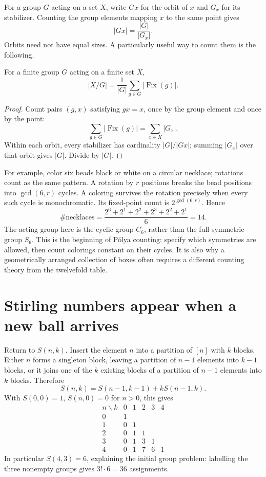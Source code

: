 For a group \(G\) acting on a set \(X\), write \(Gx\) for the orbit of \(x\) and \(G_x\) for its stabilizer. Counting the group elements mapping \(x\) to the same point gives
\[
 |Gx|=\frac{|G|}{|G_x|}.
\]
Orbits need not have equal sizes. A particularly useful way to count them is the following.

\begin{theorem}
For a finite group \(G\) acting on a finite set \(X\),
\[
 \boxed{|X/G|=\frac1{|G|}\sum_{g\in G}|\operatorname{Fix}(g)|.}
\]
\end{theorem}
\begin{proof}
Count pairs \((g,x)\) satisfying \(gx=x\), once by the group element and once by the point:
\[
 \sum_{g\in G}|\operatorname{Fix}(g)|
 =\sum_{x\in X}|G_x|.
\]
Within each orbit, every stabilizer has cardinality \(|G|/|Gx|\); summing \(|G_x|\) over that orbit gives \(|G|\). Divide by \(|G|\).
\end{proof}

For example, color six beads black or white on a circular necklace; rotations count as the same pattern. A rotation by \(r\) positions breaks the bead positions into \(\gcd(6,r)\) cycles. A coloring survives the rotation precisely when every such cycle is monochromatic. Its fixed-point count is \(2^{\gcd(6,r)}\). Hence
\[
 \#\text{necklaces}
 =\frac{2^6+2^1+2^2+2^3+2^2+2^1}{6}
 =14.
\]
The acting group here is the cyclic group \(C_6\), rather than the full symmetric group \(S_6\). This is the beginning of P\'olya counting: specify which symmetries are allowed, then count colorings constant on their cycles. It is also why a geometrically arranged collection of boxes often requires a different counting theory from the twelvefold table.

\section{Stirling numbers appear when a new ball arrives}

Return to \(S(n,k)\). Insert the element \(n\) into a partition of \([n]\) with \(k\) blocks. Either \(n\) forms a singleton block, leaving a partition of \(n-1\) elements into \(k-1\) blocks, or it joins one of the \(k\) existing blocks of a partition of \(n-1\) elements into \(k\) blocks. Therefore
\[
 \boxed{S(n,k)=S(n-1,k-1)+kS(n-1,k).}
\]
With \(S(0,0)=1\), \(S(n,0)=0\) for \(n>0\), this gives
\[
\begin{array}{c|rrrrr}
 n\backslash k &0&1&2&3&4\\ \hline
 0&1&&&&\\
 1&0&1&&&\\
 2&0&1&1&&\\
 3&0&1&3&1&\\
 4&0&1&7&6&1
\end{array}
\]
In particular \(S(4,3)=6\), explaining the initial group problem: labelling the three nonempty groups gives \(3!\cdot6=36\) assignments.

